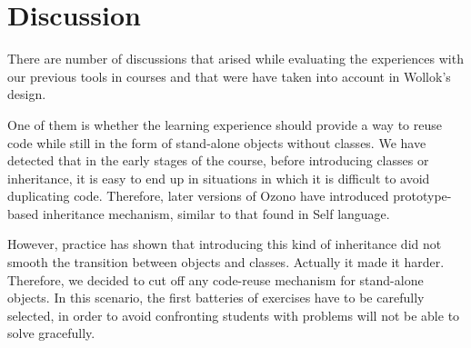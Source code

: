 \section{Discussion}
\label{sec:discussion}


There are number of discussions that arised while evaluating the experiences with our previous tools in courses 
and that were have taken into account in Wollok's design.

\medskip
One of them is whether the learning experience should provide a way to reuse
code while still in the form of stand-alone objects without classes.
We have detected that in the early stages of the course, before introducing classes or inheritance, 
it is easy to end up in situations in which it is difficult to avoid duplicating code.
Therefore, later versions of Ozono have introduced prototype-based inheritance mechanism, 
similar to that found in Self language\cite{Ungar87self:the, Ungar91organizingprograms}. 

However, practice has shown that introducing this kind of inheritance did not smooth the transition between objects and classes. Actually it made it harder.
Therefore, we decided to cut off any code-reuse mechanism for stand-alone objects.
In this scenario, the first batteries of exercises have to be carefully selected, 
in order to avoid confronting students with problems will not be able to solve gracefully.

